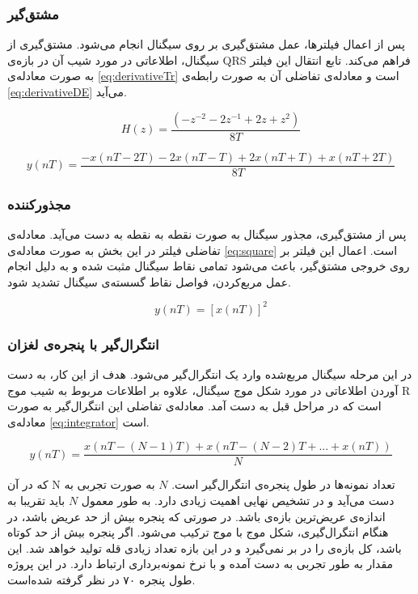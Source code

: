 \subsubsection{مشتق‌گیر}
پس از اعمال فیلترها، عمل مشتق‌گیری بر روی سیگنال انجام می‌شود. مشتق‌گیری از سیگنال، اطلاعاتی در مورد شیب آن در بازه‌ی QRS فراهم می‌کند. تابع انتقال این فیلتر به صورت معادله‌ی \ref{eq:derivativeTr} است و معادله‌ی تفاضلی آن به صورت رابطه‌ی \ref{eq:derivativeDE} می‌آید.

\begin{equation}
	H(z) = \frac{(-z^{-2}-2z^{-1}+2z+z^2)}{8T}
\label{eq:derivativeTr}
\end{equation}
	
\begin{equation}
	y(nT) = \frac{-x(nT-2T)-2x(nT-T)+2x(nT+T)+x(nT+2T)}{8T}
\label{eq:derivativeDE}
\end{equation}

\subsubsection{مجذورکننده}
پس از مشتق‌گیری، مجذور سیگنال به صورت نقطه به نقطه به دست می‌آید. معادله‌ی تفاضلی فیلتر در این بخش به صورت معادله‌ی \ref{eq:square} است. اعمال این فیلتر بر روی خروجی مشتق‌گیر، باعث می‌شود تمامی نقاط سیگنال مثبت شده و به دلیل انجام عمل مربع‌کردن، فواصل نقاط گسسته‌ی سیگنال تشدید شود.

\begin{equation}
	y(nT) = [x(nT)]^2
\label{eq:derivativeDE}
\end{equation}

\subsubsection{انتگرال‌گیر با پنجره‌ی لغزان}
در این مرحله سیگنال مربع‌شده وارد یک انتگرال‌گیر می‌شود. هدف از این کار، به دست آوردن اطلاعاتی در مورد شکل موج سیگنال، علاوه بر اطلاعات مربوط به شیب موج R است که در مراحل قبل به دست آمد. معادله‌ی تفاضلی این انتگرال‌گیر به صورت معادله‌ی \ref{eq:integrator} است.

\begin{equation}
	y(nT) = \frac{x(nT-(N-1)T) + x(nT-(N-2)T+...+x(nT))}{N}
\label{eq:integrator}
\end{equation}

که در آن N تعداد نمونه‌ها در طول پنجره‌ی انتگرال‌گیر است. $N$ به صورت تجربی به دست می‌آید و در تشخیص نهایی  اهمیت زیادی دارد. به طور معمول $N$ باید تقریبا به اندازه‌ی عریض‌ترین بازه‌ی  باشد. در صورتی که پنجره بیش از حد عریض باشد، در هنگام انتگرال‌گیری، شکل موج  با موج  ترکیب می‌شود. اگر پنجره بیش از حد کوتاه باشد، کل بازه‌ی  را در بر نمی‌گیرد و در این بازه تعداد زیادی قله تولید خواهد شد. این مقدار به طور تجربی به دست آمده و با نرخ نمونه‌برداری ارتباط دارد. در این پروژه طول پنجره ۷۰ در نظر گرفته شده‌است.

